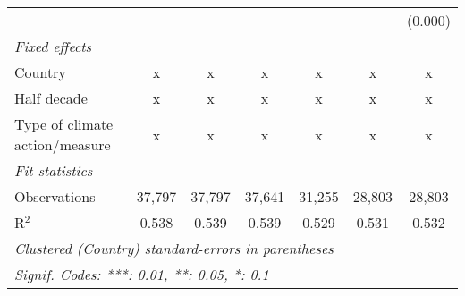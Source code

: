 \begin{tabular}{lcccccc}
                                                             &         &               &              &              &              & (0.000)\\   
   \emph{Fixed effects}\\
   Country                                                   & x       & x             & x            & x            & x            & x\\  
   Half decade                                               & x       & x             & x            & x            & x            & x\\  
   Type of climate action/measure                            & x       & x             & x            & x            & x            & x\\  
   \midrule \emph{Fit statistics}\\
   Observations                                              & 37,797  & 37,797        & 37,641       & 31,255       & 28,803       & 28,803\\  
   R$^2$                                                     & 0.538   & 0.539         & 0.539        & 0.529        & 0.531        & 0.532\\  
   \midrule
   \multicolumn{7}{l}{\emph{Clustered (Country) standard-errors in parentheses}}\\
   \multicolumn{7}{l}{\emph{Signif. Codes: ***: 0.01, **: 0.05, *: 0.1}}\\
\end{tabular}
\par\endgroup



